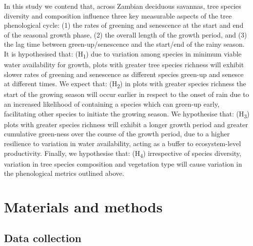\documentclass[11pt,a4paper]{article}
\begin{document}
In this study we contend that, across Zambian deciduous savannas, tree species diversity and composition influence three key measurable aspects of the tree phenological cycle: (1) the rates of greening and senescence at the start and end of the seasonal growth phase, (2) the overall length of the growth period, and (3) the lag time between green-up/senescence and the start/end of the rainy season. It is hypothesised that: (H\textsubscript{1}) due to variation among species in minimum viable water availability for growth, plots with greater tree species richness will exhibit slower rates of greening and senescence as different species green-up and senesce at different times. We expect that: (H\textsubscript{2}) in plots with greater species richness the start of the growing season will occur earlier in respect to the onset of rain due to an increased likelihood of containing a species which can green-up early, facilitating other species to initiate the growing season. We hypothesise that: (H\textsubscript{3}) plots with greater species richness will exhibit a longer growth period and greater cumulative green-ness over the course of the growth period, due to a higher resilience to variation in water availability, acting as a buffer to ecosystem-level productivity. Finally, we hypothesise that: (H\textsubscript{4}) irrespective of species diversity, variation in tree species composition and vegetation type will cause variation in the phenological metrics outlined above. 

\section{Materials and methods}

\subsection{Data collection}
\end{document}
